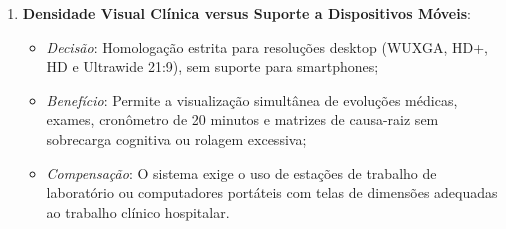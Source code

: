 \begin{enumerate}
    \item \textbf{Densidade Visual Clínica versus Suporte a Dispositivos Móveis}:
    \begin{itemize}
        \item \textit{Decisão}: Homologação estrita para resoluções desktop (WUXGA, HD+, HD e Ultrawide 21:9), sem suporte para smartphones;
        \item \textit{Benefício}: Permite a visualização simultânea de evoluções médicas, exames, cronômetro de 20 minutos e matrizes de causa-raiz sem sobrecarga cognitiva ou rolagem excessiva;
        \item \textit{Compensação}: O sistema exige o uso de estações de trabalho de laboratório ou computadores portáteis com telas de dimensões adequadas ao trabalho clínico hospitalar.
    \end{itemize}
\end{enumerate}

